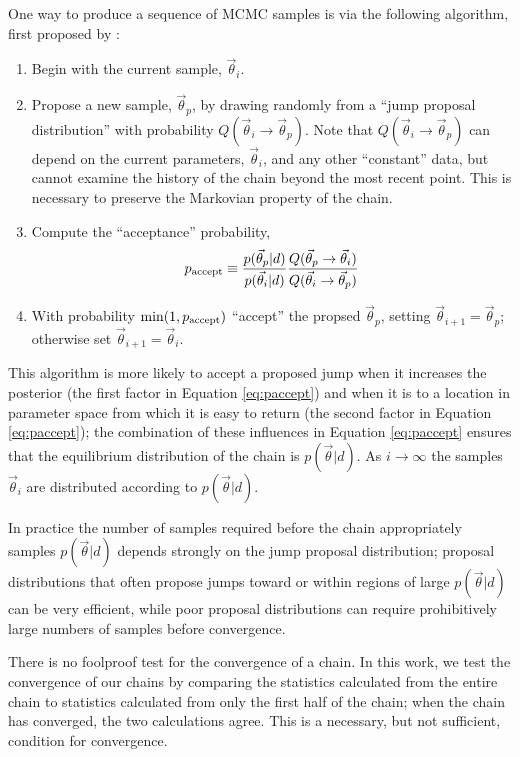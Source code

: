 \documentclass[preprint]{aastex}
\newcommand{\vtheta}{\vec{\theta}}
\begin{document}
One way to produce a sequence of MCMC samples is via the following
algorithm, first proposed by \citet{Metropolis1953}:
\begin{enumerate}
  \item Begin with the current sample, $\vtheta_i$.
  \item Propose a new sample, $\vtheta_p$, by drawing randomly from a
    ``jump proposal distribution'' with probability $Q(\vtheta_i \to
    \vtheta_p)$.  Note that $Q(\vtheta_i \to \vtheta_p)$ can depend on
    the current parameters, $\vtheta_i$, and any other ``constant''
    data, but cannot examine the history of the chain beyond the most
    recent point.  This is necessary to preserve the Markovian
    property of the chain.
  \item Compute the ``acceptance'' probability,
    \begin{equation}
      \label{eq:paccept}
      p_{\textnormal{accept}} \equiv
      \frac{p(\vtheta_p|d)}{p(\vtheta_i|d)} \frac{Q(\vtheta_p \to
        \vtheta_i)}{Q(\vtheta_i \to \vtheta_p)}
    \end{equation}
  \item With probability $\min(1,p_{\textnormal{accept}})$ ``accept''
    the propsed $\vtheta_p$, setting $\vtheta_{i+1} = \vtheta_p$;
    otherwise set $\vtheta_{i+1} = \vtheta_i$.
\end{enumerate}
This algorithm is more likely to accept a proposed jump when it
increases the posterior (the first factor in Equation
\eqref{eq:paccept}) and when it is to a location in parameter space
from which it is easy to return (the second factor in Equation
\eqref{eq:paccept}); the combination of these influences in Equation
\eqref{eq:paccept} ensures that the equilibrium distribution of the
chain is $p(\vtheta|d)$.  As $i \to \infty$ the samples $\vtheta_i$
are distributed according to $p(\vtheta|d)$.  

In practice the number of samples required before the chain
appropriately samples $p(\vtheta|d)$ depends strongly on the jump
proposal distribution; proposal distributions that often propose jumps
toward or within regions of large $p(\vtheta|d)$ can be very
efficient, while poor proposal distributions can require prohibitively
large numbers of samples before convergence.  

There is no foolproof test for the convergence of a chain.  In this
work, we test the convergence of our chains by comparing the
statistics calculated from the entire chain to statistics calculated
from only the first half of the chain; when the chain has converged,
the two calculations agree.  This is a necessary, but not sufficient,
condition for convergence.
\end{document}
